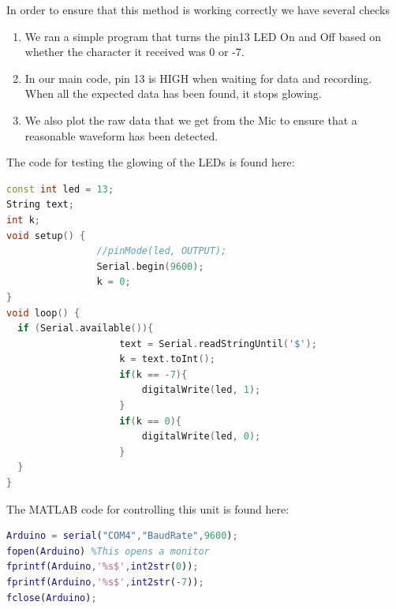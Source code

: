 In order to ensure that this method is working correctly we have several checks 

\begin{enumerate}
    \item We ran a simple program that turns the pin13 LED On and Off based on
    whether the character it received was 0 or -7.

    \item In our main code, pin 13 is HIGH when waiting for data and recording.
    When all the expected data has been found, it stops glowing.
    
    \item We also plot the raw data that we get from the Mic to ensure that a
    reasonable waveform has been detected.
\end{enumerate}

The code for testing the glowing of the LEDs is found here: 

\begin{lstlisting}[language=C++]
const int led = 13;
String text;
int k;
void setup() {
                //pinMode(led, OUTPUT);
                Serial.begin(9600);
                k = 0;
}
void loop() { 
  if (Serial.available()){
                    text = Serial.readStringUntil('$');
                    k = text.toInt(); 
                    if(k == -7){
                        digitalWrite(led, 1);
                    }
                    if(k == 0){
                        digitalWrite(led, 0);
                    }
  }
}
\end{lstlisting}

The MATLAB code for controlling this unit is found here: 

\begin{lstlisting}[language=Matlab]
Arduino = serial("COM4","BaudRate",9600);
fopen(Arduino) %This opens a monitor
fprintf(Arduino,'%s$',int2str(0));
fprintf(Arduino,'%s$',int2str(-7));
fclose(Arduino);
\end{lstlisting}

